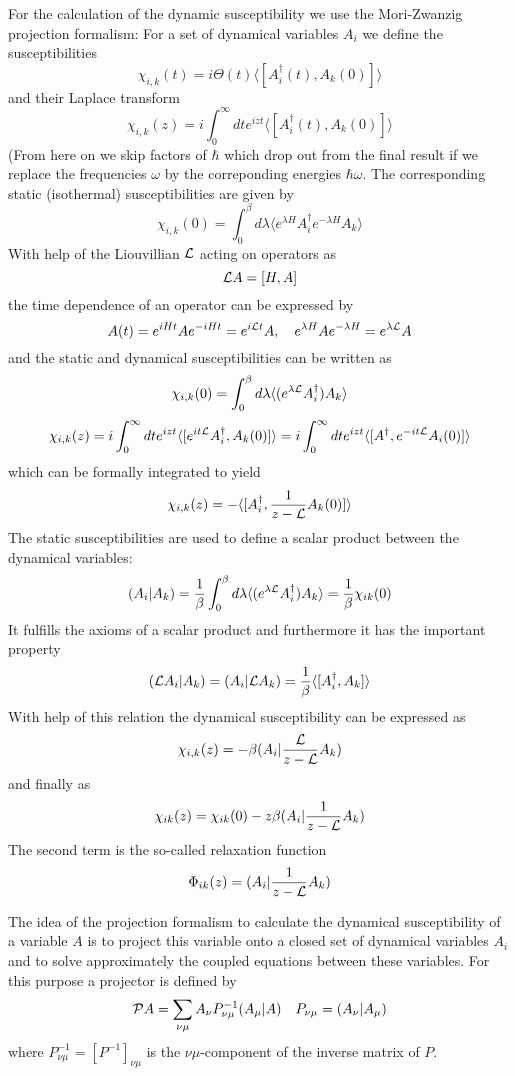 For the calculation of the dynamic susceptibility we use the Mori-Zwanzig
projection formalism:
For a set of dynamical variables $A_i$ we define the susceptibilities 
$$
\chi_{i,k}(t)=i \Theta(t) \langle [A_i^\dagger(t),A_k(0)]\rangle
$$ 
and their Laplace transform
$$
\chi_{i,k}(z)=i\int_0^\infty dt e^{izt} \langle [A_i^\dagger(t),A_k(0)]\rangle
$$ 
(From here on we skip factors of $\hbar$ which drop out from the final
result if we replace the frequencies $\omega$ by the correponding energies
$\hbar \omega$.  The corresponding static (isothermal) susceptibilities are given by
$$
\chi_{i,k}(0) = \int_0^\beta d \lambda \langle e^{\lambda H}
A_i^\dagger e^{-\lambda H}  A_k\rangle
$$
With help of the Liouvillian ${\cal L}$ acting on operators as 
$$
{\cal L}A=[H,A]
$$ 
the time dependence of an operator can be expressed by
$$
A(t)=e^{iHt}Ae^{-iHt}= e^{i{\cal L}t}A, \quad e^{\lambda H}Ae^{-\lambda H}=
e^{\lambda {\cal L} }A
$$
and the static and dynamical susceptibilities can be written as
$$
\chi_{i,k}(0) = \int_0^\beta d \lambda \langle (e^{\lambda {\cal L}}
A_i^\dagger)   A_k\rangle
$$
$$
\chi_{i,k}(z)=i\int_0^\infty dt e^{izt} \langle [e^{it{\cal
L}}A_i^\dagger,A_k(0)]\rangle= i\int_0^\infty dt e^{izt} \langle [A^\dagger,e^{-it{\cal
L}}A_i(0)]\rangle
$$ 
which can be formally integrated to yield
$$
\chi_{i,k}(z)= -\langle [A_i^\dagger,{1\over {z-\cal
L}}A_k(0)]\rangle
$$ 
The static susceptibilities are used to define a scalar product between  the
dynamical variables:
$$
(A_i \vert A_k) =  {1\over \beta }\int_0^\beta d\lambda \langle
(e^{\lambda{\cal L}}A_i^\dagger)A_k\rangle ={1\over \beta} \chi_{ik}(0)
$$
It fulfills the axioms of a scalar product and  furthermore it has the important property
$$
({\cal L}A_i\vert A_k)=(A_i\vert {\cal L}A_k)={1\over \beta}\langle
[A_i^\dagger,A_k]\rangle
$$
With help of this relation the dynamical susceptibility can be
expressed as
$$
\chi_{i,k}(z)= -\beta (A_i\vert {{\cal L}\over {z-\cal L}} A_k)
$$
and finally as 
$$
\chi_{ik}(z)=\chi_{ik}(0)-z\beta (A_i\vert {1\over {z-\cal L}}A_k)  
$$
The second term is the so-called relaxation function 
$$
\Phi_{ik}(z)=(A_i \vert {1 \over {z-\cal L}}A_k)
$$

The idea of the projection formalism to calculate the dynamical
susceptibility of a variable $A$ is to project this variable  onto a closed
set of dynamical variables $A_i$ and to solve approximately the coupled
equations between these variables. For this purpose a projector is defined
by
$$
{\cal P} A= \sum_{\nu \mu}A_\nu P^{-1}_{\nu \mu}(A_\mu\vert A) \quad
P_{\nu\mu}=(A_\nu\vert A_\mu)
$$ 
where $ P^{-1}_{\nu \mu}=[P^{-1}]_{\nu \mu}$ is the ${\nu\mu}$-component of the inverse matrix of
$P$. 

